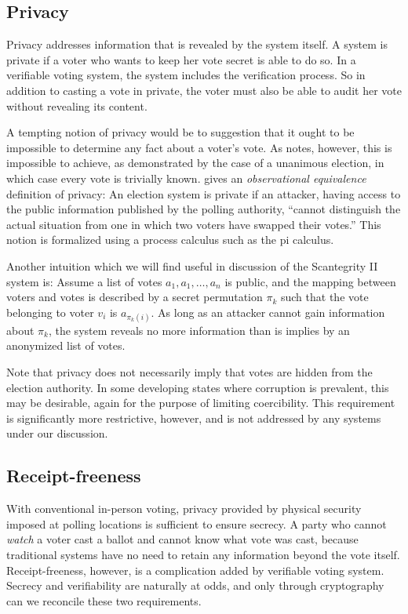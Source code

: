 \documentclass[10pt,twocolumn]{article}
\newcommand{\term}[1]{\textit{#1}}
\begin{document}
\subsection{Privacy}

Privacy addresses information that is revealed by the system itself.
A system is private if a voter who wants to keep her vote secret is able to do so.
In a verifiable voting system, the system includes the verification process.
So in addition to casting a vote in private, the voter must also be able to
audit her vote without revealing its content.

A tempting notion of privacy would be to suggestion that it ought to be impossible
to determine any fact about a voter's vote. As \cite{preta} notes, however,
this is impossible to achieve, as demonstrated by the case of a unanimous election,
in which case every vote is trivially known.
\cite{kremer} gives an \term{observational equivalence} definition of privacy:
An election system is private if an attacker, having access to the public
information published by the polling authority, ``cannot distinguish
the actual situation from one in which two voters have swapped their votes.''
This notion is formalized using a process calculus such as the pi calculus.

Another intuition which we will find useful in discussion of the Scantegrity II system is:
Assume a list of votes $a_1, a_1, \ldots, a_n$ is public, and the mapping between
voters and votes is described by a secret permutation $\pi_k$ such that the vote
belonging to voter $v_i$ is $a_{\pi_k(i)}$.
As long as an attacker cannot gain information about $\pi_k$,
the system reveals no more information than is implies by an anonymized list of votes.

Note that privacy does not necessarily imply that votes are hidden from the election
authority. In some developing states where corruption is prevalent, this may be desirable,
again for the purpose of limiting coercibility.
This requirement is significantly more restrictive, however, and is not addressed by
any systems under our discussion.

\subsection{Receipt-freeness}

With conventional in-person voting, privacy provided by physical security imposed
at polling locations is sufficient to ensure secrecy.
A party who cannot \emph{watch} a voter cast a ballot and cannot know what vote
was cast, because traditional systems have no need to retain any information
beyond the vote itself.
Receipt-freeness, however, is a complication added by verifiable voting system.
Secrecy and verifiability are naturally at odds, and only through cryptography can we
reconcile these two requirements.
\end{document}
